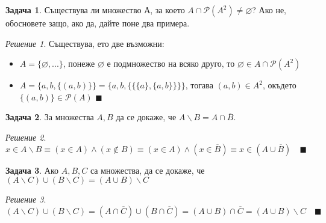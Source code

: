 \documentclass[10pt, a4paper]{article}
\theoremstyle{definition}
\newtheorem{problem}{Задача}
\theoremstyle{remark}
\newtheorem*{sol}{Решение}
\begin{document}
\hfill
\begin{problem}
    Съществува ли множество А, за което \(A\cap\mathcal{P}(A^2)\neq\varnothing\)? Ако не, обосновете защо, ако да, дайте поне два примера.
\end{problem}
\begin{sol}
    Съществува, ето две възможни:
    \begin{itemize}
        \item \(A=\{\varnothing, ...\}\), понеже \(\varnothing\) е подмножество на всяко друго, то \(\varnothing\in A\cap\mathcal{P}(A^2)\)
        \item \(A=\{a, b, \{(a,b)\}\}=\{a, b, \{\{\{a\},\{a,b\}\}\}\}\), тогава \((a,b)\in A^2\), окъдето \(\{(a,b)\}\in\mathcal{P}(A)\) \(\blacksquare\)
    \end{itemize}
\end{sol}

\hfill
\begin{problem}
    За множества $A, B$ да се докаже, че \(A\backslash B=A\cap\overline{B}\).
\end{problem}
\begin{sol}
    $x\in A\backslash B\equiv (x\in A) \wedge (x\notin B) \equiv (x\in A)\wedge (x\in \overline{B})\equiv x\in(A\cup \overline{B})\quad\blacksquare$
\end{sol}

\hfill
\begin{problem}
    Ако $A, B, C$ са множества, да се докаже, че $(A\backslash C)\cup(B\backslash C)=(A\cup B)\backslash C$
\end{problem}
\begin{sol}
    $(A\backslash C)\cup(B\backslash C)=(A\cap\overline{C})\cup(B\cap\overline C)=(A\cup B)\cap\overline{C}=(A\cup B)\backslash C\quad\blacksquare$
\end{sol}
\end{document}
